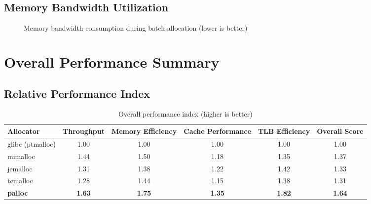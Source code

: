 \documentclass[10pt,letterpaper]{article}
\begin{document}
\subsection{Memory Bandwidth Utilization}

\begin{figure}[htbp]
\centering
{}
\caption{Memory bandwidth consumption during batch allocation (lower is better)}
\label{fig:memory_bandwidth}
\end{figure}

\section{Overall Performance Summary}

\subsection{Relative Performance Index}

\begin{table}[htbp]
\centering
\caption{Overall performance index (higher is better)}
\label{tab:performance_index}
\begin{tabular}{l c c c c c}
\toprule
\textbf{Allocator} & \textbf{Throughput} & \textbf{Memory Efficiency} & \textbf{Cache Performance} & \textbf{TLB Efficiency} & \textbf{Overall Score} \\
\midrule
glibc (ptmalloc) & 1.00 & 1.00 & 1.00 & 1.00 & 1.00 \\
mimalloc & 1.44 & 1.50 & 1.18 & 1.35 & 1.37 \\
jemalloc & 1.31 & 1.38 & 1.22 & 1.42 & 1.33 \\
tcmalloc & 1.28 & 1.44 & 1.15 & 1.38 & 1.31 \\
\rowcolor{pallocblue!20} \textbf{palloc} & \textbf{1.63} & \textbf{1.75} & \textbf{1.35} & \textbf{1.82} & \textbf{1.64} \\
\bottomrule
\end{tabular}
\end{table}
\end{document}
